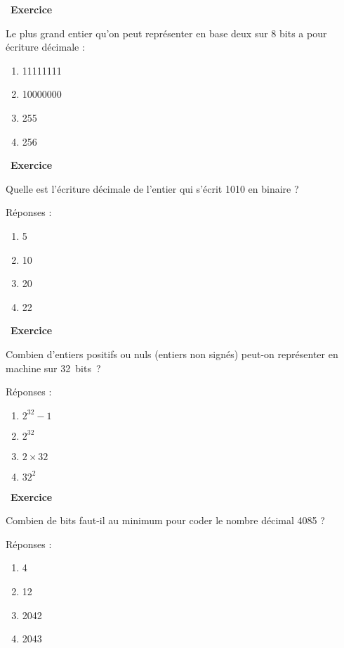 \documentclass[
  11pt,
]{article}
\providecommand{\tightlist}{%
  \setlength{\itemsep}{0pt}\setlength{\parskip}{0pt}}
\newcounter{exo}
\newenvironment{exercice}[1]
{\par \medskip   \addtocounter{exo}{1} \noindent  
\begin{bclogo}[arrondi =0.1,   noborder = true, logo=\bccrayon, marge=4]{~\textbf{Exercice} \textbf{\theexo} {\itshape #1} }  \par}
{
\end{bclogo}
 \par \bigskip }
\newcounter{def}
\begin{document}
\begin{exercice}{}

Le plus grand entier qu'on peut représenter en base deux sur 8 bits a
pour écriture décimale :

\begin{enumerate}
\def\labelenumi{\arabic{enumi}.}
\tightlist
\item
  11111111
\item
  10000000
\item
  255
\item
  256
\end{enumerate}

\end{exercice}

\begin{exercice}{}

Quelle est l'écriture décimale de l'entier qui s'écrit 1010 en binaire ?

Réponses :

\begin{enumerate}
\def\labelenumi{\arabic{enumi}.}
\item
  5
\item
  10
\item
  20
\item
  22
\end{enumerate}

\end{exercice}

\begin{exercice}{}

Combien d'entiers positifs ou nuls (entiers non signés) peut-on
représenter en machine sur 32~bits~?

Réponses :

\begin{enumerate}
\def\labelenumi{\arabic{enumi}.}
\tightlist
\item
  \(2^{32} - 1\)
\item
  \(2^{32}\)
\item
  \(2 \times 32\)
\item
  \(32^{2}\)
\end{enumerate}

\end{exercice}

\begin{exercice}{}

Combien de bits faut-il au minimum pour coder le nombre décimal 4085 ?

Réponses :

\begin{enumerate}
\def\labelenumi{\arabic{enumi}.}
\tightlist
\item
  4
\item
  12
\item
  2042
\item
  2043
\end{enumerate}

\end{exercice}
\end{document}
